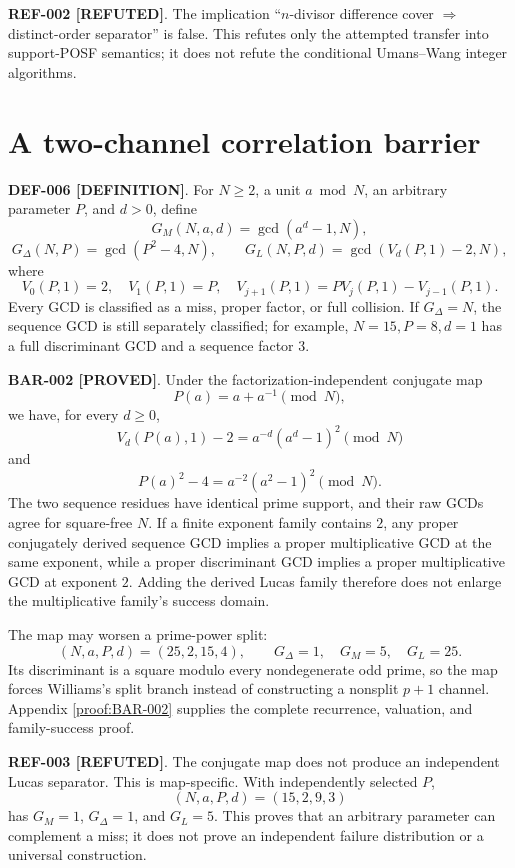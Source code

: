 \documentclass[11pt]{article}
\newcommand{\claimstatus}[2]{\textbf{#1 [#2]}}
\begin{document}
\claimstatus{REF-002}{REFUTED}. The implication
``\(n\)-divisor difference cover \(\Rightarrow\) distinct-order separator''
is false. This refutes only the attempted transfer into support-POSF
semantics; it does not refute the conditional Umans--Wang integer algorithms.

\section{A two-channel correlation barrier}

\claimstatus{DEF-006}{DEFINITION}. For \(N\ge2\), a unit \(a\bmod N\), an
arbitrary parameter \(P\), and \(d>0\), define
\[
G_M(N,a,d)=\gcd(a^d-1,N),
\]
\[
G_\Delta(N,P)=\gcd(P^2-4,N),\qquad
G_L(N,P,d)=\gcd(V_d(P,1)-2,N),
\]
where
\[
V_0(P,1)=2,\quad V_1(P,1)=P,\quad
V_{j+1}(P,1)=PV_j(P,1)-V_{j-1}(P,1).
\]
Every GCD is classified as a miss, proper factor, or full collision. If
\(G_\Delta=N\), the sequence GCD is still separately classified; for example,
\(N=15,P=8,d=1\) has a full discriminant GCD and a sequence factor \(3\).

\claimstatus{BAR-002}{PROVED}. Under the factorization-independent conjugate
map
\[
P(a)=a+a^{-1}\pmod N,
\]
we have, for every \(d\ge0\),
\[
V_d(P(a),1)-2=a^{-d}(a^d-1)^2\pmod N
\]
and
\[
P(a)^2-4=a^{-2}(a^2-1)^2\pmod N.
\]
The two sequence residues have identical prime support, and their raw GCDs
agree for square-free \(N\). If a finite exponent family contains \(2\), any
proper conjugately derived sequence GCD implies a proper multiplicative GCD
at the same exponent, while a proper discriminant GCD implies a proper
multiplicative GCD at exponent \(2\). Adding the derived Lucas family therefore
does not enlarge the multiplicative family's success domain.

The map may worsen a prime-power split:
\[
(N,a,P,d)=(25,2,15,4),\qquad
G_\Delta=1,\quad G_M=5,\quad G_L=25.
\]
Its discriminant is a square modulo every nondegenerate odd prime, so the map
forces Williams's split branch instead of constructing a nonsplit \(p+1\)
channel. Appendix \ref{proof:BAR-002} supplies the complete recurrence,
valuation, and family-success proof.

\claimstatus{REF-003}{REFUTED}. The conjugate map does not produce an
independent Lucas separator. This is map-specific. With independently selected
\(P\),
\[
(N,a,P,d)=(15,2,9,3)
\]
has \(G_M=1\), \(G_\Delta=1\), and \(G_L=5\). This proves that an arbitrary
parameter can complement a miss; it does not prove an independent failure
distribution or a universal construction.
\end{document}
